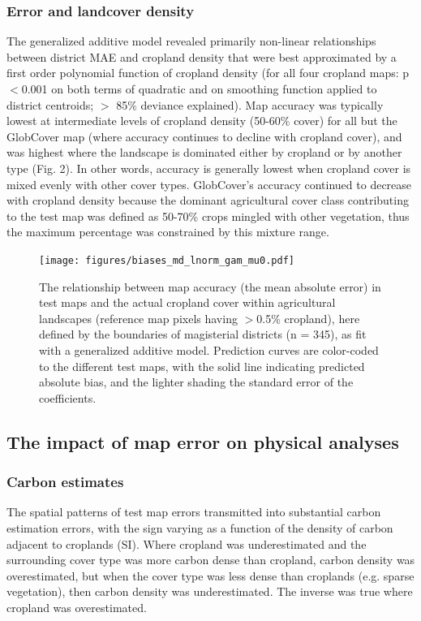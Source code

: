 \documentclass[a4paper]{article}
\begin{document}
\subsubsection*{Error and landcover density}
The generalized additive model revealed primarily non-linear relationships between district MAE and cropland density that were best approximated by a first order polynomial function of cropland density (for all four cropland maps: p$<$0.001 on both terms of quadratic and on smoothing function applied to district centroids; $>$ 85\% deviance explained). Map accuracy was typically lowest at intermediate levels of cropland density (50-60\% cover) for all but the GlobCover map (where accuracy continues to decline with cropland cover), and was highest where the landscape is dominated either by cropland or by another type (Fig. 2). In other words, accuracy is generally lowest when cropland cover is mixed evenly with other cover types. GlobCover's accuracy continued to decrease with cropland density because the dominant agricultural cover class contributing to the test map was defined as 50-70\% crops mingled with other vegetation, thus the maximum percentage was constrained by this mixture range.  

\begin{figure}[!h]
\centerline{\texttt{[image: figures/biases\_md\_lnorm\_gam\_mu0.pdf]}}
\caption{The relationship between map accuracy (the mean absolute error) in test maps and the actual cropland cover within agricultural landscapes (reference map pixels having $>$0.5\% cropland), here defined by the boundaries of magisterial districts (n = 345), as fit with a generalized additive model. Prediction curves are color-coded to the different test maps, with the solid line indicating predicted absolute bias, and the lighter shading the standard error of the coefficients.}\label{afoto2}
\end{figure}


\subsection*{The impact of map error on physical analyses}
\subsubsection*{Carbon estimates}
The spatial patterns of test map errors transmitted into substantial carbon estimation errors, with the sign varying as a function of the density of carbon adjacent to croplands (SI). Where cropland was underestimated and the surrounding cover type was more carbon dense than cropland, carbon density was overestimated, but when the cover type was less dense than croplands (e.g. sparse vegetation), then carbon density was underestimated. The inverse was true where cropland was overestimated. 
\end{document}
